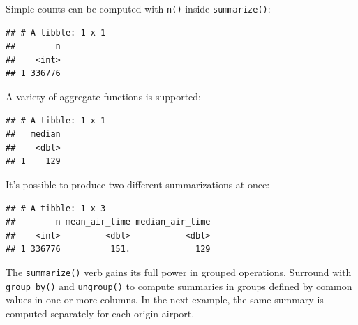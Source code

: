 \documentclass[]{book}
\newenvironment{Shaded}{}{}
\newcommand{\DataTypeTok}[1]{#1}
\newcommand{\KeywordTok}[1]{\textcolor[rgb]{0.00,0.00,1.00}{#1}}
\newcommand{\NormalTok}[1]{#1}
\newcommand{\OperatorTok}[1]{#1}
\newcommand{\OtherTok}[1]{\textcolor[rgb]{1.00,0.25,0.00}{#1}}
\newcommand{\StringTok}[1]{\textcolor[rgb]{0.00,0.50,0.50}{#1}}
\begin{document}
Simple counts can be computed with \texttt{n()} inside \texttt{summarize()}:

\begin{Shaded}
\end{Shaded}

\begin{verbatim}
## # A tibble: 1 x 1
##        n
##    <int>
## 1 336776
\end{verbatim}

A variety of aggregate functions is supported:

\begin{Shaded}
\end{Shaded}

\begin{verbatim}
## # A tibble: 1 x 1
##   median
##    <dbl>
## 1    129
\end{verbatim}

It's possible to produce two different summarizations at once:

\begin{Shaded}
\end{Shaded}

\begin{verbatim}
## # A tibble: 1 x 3
##        n mean_air_time median_air_time
##    <int>         <dbl>           <dbl>
## 1 336776          151.             129
\end{verbatim}

The \texttt{summarize()} verb gains its full power in grouped operations.
Surround with \texttt{group\_by()} and \texttt{ungroup()} to compute summaries in groups defined by common values in one or more columns.
In the next example, the same summary is computed separately for each origin airport.
\end{document}
